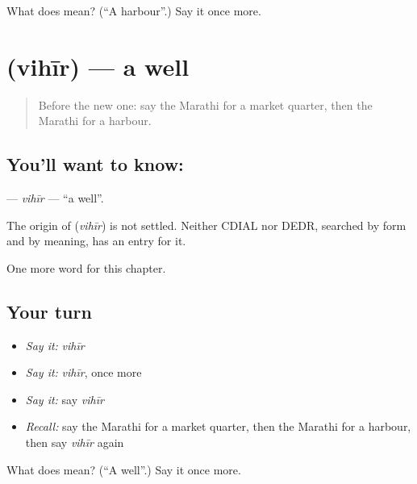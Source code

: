 \begin{tcolorbox}[breakable,colback=teal!4,colframe=teal!35!black,title={Before you move on}]
What does  mean? (\textquotedblleft{}A harbour\textquotedblright{}.) Say it once more.
\end{tcolorbox}
\section[\texorpdfstring{\mr{विहीर} (vihīr)}{विहीर (vihīr)}]{ (vihīr) — a well}

\label{lesson:MR-C217-vihir}



\begin{quote}
Before the new one: say the Marathi for a market quarter, then the Marathi for a harbour.
\end{quote}

\subsection*{You'll want to know: }
\textbf{} — \emph{vihīr} — \textquotedblleft{}a well\textquotedblright{}.

\begin{cousinweb}
The origin of \textbf{} (\emph{vihīr}) is not settled. Neither CDIAL nor DEDR, searched by form and by meaning, has an entry for it.
\end{cousinweb}

\begin{grammarlens}[title={What you've built}]
One more word for this chapter.
\end{grammarlens}

\subsection*{Your turn}
\begin{itemize}
\raggedright
  \item \emph{Say it:} \emph{vihīr}
  \item \emph{Say it:} \emph{vihīr}, once more
  \item \emph{Say it:} say \emph{vihīr}
  \item \emph{Recall:} say the Marathi for a market quarter, then the Marathi for a harbour, then say \emph{vihīr} again
\end{itemize}

\begin{tcolorbox}[breakable,colback=teal!4,colframe=teal!35!black,title={Before you move on}]
What does  mean? (\textquotedblleft{}A well\textquotedblright{}.) Say it once more.
\end{tcolorbox}
